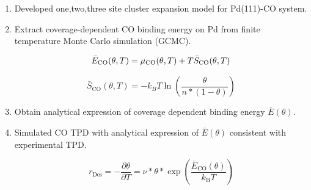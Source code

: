 \documentclass[11pt]{article}
\begin{document}
\begin{enumerate}
\item Developed one,two,three site cluster expansion model for Pd(111)-CO system.

\item Extract coverage-dependent CO binding energy on Pd from finite temperature Monte Carlo simulation (GCMC).

\begin{equation}\label{gcmc}
\bar{E}_{\ce{CO}}(\theta,T) =\mu_{\ce{CO}}(\theta,T)+T \bar{S}_{\ce{CO}}(\theta,T)
\end{equation}

\begin{equation} \label{entropy_n_meanfield}
	\bar{S}_\text{CO}(\theta,T) = -k_B T \ln \left ( \frac{\theta}{n*(1-\theta)} \right )
\end{equation}

\item Obtain analytical expression of coverage dependent binding energy $\bar{E}(\theta)$.
\item Simulated CO TPD with analytical expression of $\bar{E}(\theta)$ consistent with experimental TPD. 

\begin{equation}\label{tpd}
r_\mathrm{Des}=-\frac{\partial \theta}{\partial T}={\nu *\theta}*\exp \left( \frac{\bar{E}_\mathrm{CO}(\theta)}{k_\mathrm{B} T} \right)
\end{equation}

\end{enumerate}
\end{document}
